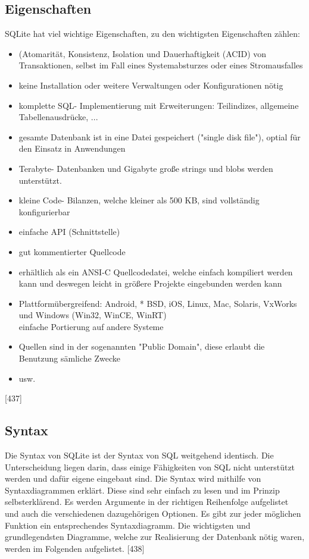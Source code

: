 \documentclass[12pt,a4paper]{report}
\begin{document}
\begin{onehalfspace}
\subsection{Eigenschaften}
SQLite hat viel wichtige Eigenschaften, zu den wichtigsten Eigenschaften zählen:
\begin{itemize}
\item (Atomarität, Konsistenz, Isolation und Dauerhaftigkeit (ACID) von Transaktionen, selbst im Fall eines Systemabsturzes oder eines Stromausfalles
\item keine Installation oder weitere Verwaltungen oder Konfigurationen nötig
\item komplette SQL- Implementierung mit Erweiterungen: Teilindizes, allgemeine Tabellenausdrücke, ...
\item gesamte Datenbank ist in eine Datei gespeichert ("{}single disk file"{}), optial für den Einsatz in Anwendungen
\item Terabyte- Datenbanken und Gigabyte große strings und blobs werden unterstützt.
\item kleine Code- Bilanzen, welche kleiner als 500 KB, sind vollständig konfigurierbar
\item einfache API (Schnittstelle)
\item gut kommentierter Quellcode
\item erhältlich als ein ANSI-C Quellcodedatei, welche einfach kompiliert werden kann und deswegen leicht in größere Projekte eingebunden werden kann
\item Plattformübergreifend: Android, * BSD, iOS, Linux, Mac, Solaris, VxWorks und Windows (Win32, WinCE, WinRT)\\
einfache Portierung auf andere Systeme
\item Quellen sind in der sogenannten "{}Public Domain"{}, diese erlaubt die Benutzung sämliche Zwecke
\item usw.
\end{itemize}
[437]
\subsection{Syntax}
Die Syntax von SQLite ist der Syntax von SQL weitgehend identisch. Die Unterscheidung liegen darin, dass einige Fähigkeiten von SQL nicht unterstützt werden und dafür eigene eingebaut sind. Die Syntax wird mithilfe von Syntaxdiagrammen erklärt.
Diese sind sehr einfach zu lesen und im Prinzip selbsterklärend. Es werden Argumente in der richtigen Reihenfolge aufgelistet und auch die verschiedenen dazugehörigen Optionen. Es gibt zur jeder möglichen Funktion ein entsprechendes Syntaxdiagramm. Die wichtigsten und grundlegendsten Diagramme, welche zur Realisierung der Datenbank nötig waren, werden im Folgenden aufgelistet. [438]


\end{onehalfspace}
\end{document}
